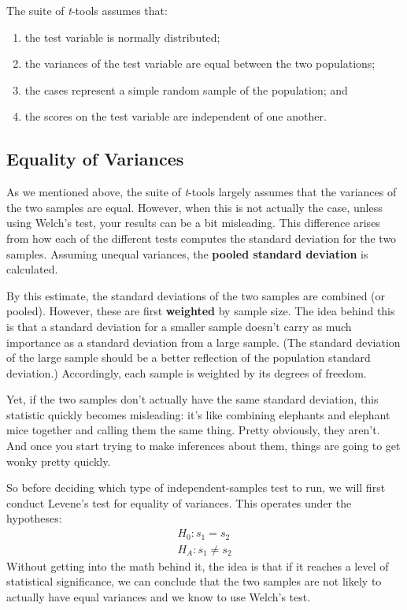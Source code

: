 The suite of \textit{t}-tools assumes that:
\begin{enumerate}
\item the test variable is normally distributed;
\item the variances of the test variable are equal between the two populations;
\item the cases represent a simple random sample of the population; and
\item the scores on the test variable are independent of one another.
\end{enumerate}

\subsection{Equality of Variances}

As we mentioned above, the suite of \textit{t}-tools largely assumes that the variances of the two samples are equal. However, when this is not actually the case, unless using Welch's test, your results can be a bit misleading. This difference arises from how each of the different tests computes the standard deviation for the two samples. Assuming unequal variances, the \textbf{pooled standard deviation} is calculated.

By this estimate, the standard deviations of the two samples are combined (or pooled). However, these are first \textbf{weighted} by sample size. The idea behind this is that a standard deviation for a smaller sample doesn't carry as much importance as a standard deviation from a large sample. (The standard deviation of the large sample should be a better reflection of the population standard deviation.) Accordingly, each sample is weighted by its degrees of freedom.

Yet, if the two samples don't actually have the same standard deviation, this statistic quickly becomes misleading: it's like combining elephants and elephant mice together and calling them the same thing. Pretty obviously, they aren't. And once you start trying to make inferences about them, things are going to get wonky pretty quickly.

So before deciding which type of independent-samples test to run, we will first conduct Levene's test for equality of variances. This operates under the hypotheses:
\begin{eqnarray*}
H_0:s_1=s_2 \\
H_A:s_1\neq s_2
\end{eqnarray*}
Without getting into the math behind it, the idea is that if it reaches a level of statistical significance, we can conclude that the two samples are not likely to actually have equal variances and we know to use Welch's test.

